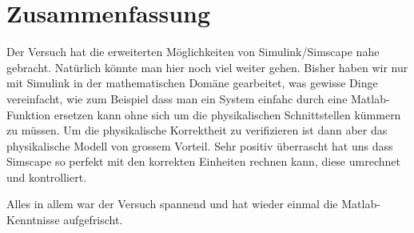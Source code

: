 \documentclass{fhnwreport} %
\begin{document}
\section{Zusammenfassung}

Der Versuch hat die erweiterten Möglichkeiten von Simulink/Simscape nahe gebracht. Natürlich könnte man hier noch viel weiter gehen. Bisher haben wir nur mit Simulink in der mathematischen Domäne gearbeitet, was gewisse Dinge vereinfacht, wie zum Beispiel dass man ein System einfahc durch eine Matlab-Funktion ersetzen kann ohne sich um die physikalischen Schnittstellen kümmern zu müssen.
Um die physikalische Korrektheit zu verifizieren ist dann aber das physikalische Modell von grossem Vorteil.
Sehr positiv überrascht hat uns dass Simscape so perfekt mit den korrekten Einheiten rechnen kann, diese umrechnet und kontrolliert.

Alles in allem war der Versuch spannend und hat wieder einmal die Matlab-Kenntnisse aufgefrischt.
\end{document}
